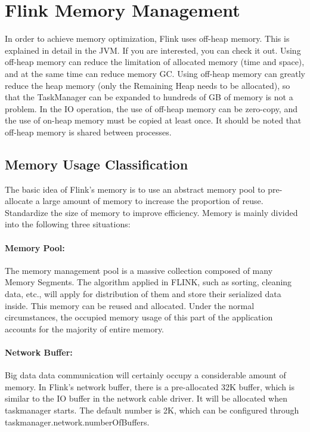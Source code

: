 \section*{Flink Memory Management}
In order to achieve memory optimization, Flink uses off-heap memory.
This is explained in detail in the JVM. If you are interested, you can
check it out. Using off-heap memory can reduce the limitation of
allocated memory (time and space), and at the same time can reduce
memory GC. Using off-heap memory can greatly reduce the heap memory
(only the Remaining Heap needs to be allocated), so that the
TaskManager can be expanded to hundreds of GB of memory is not a
problem. In the IO operation, the use of off-heap memory can be
zero-copy, and the use of on-heap memory must be copied at least once.
It should be noted that off-heap memory is shared between processes.

\subsection*{Memory Usage Classification}
The basic idea of Flink's memory is to use an abstract memory pool to
pre-allocate a large amount of memory to increase the proportion of
reuse. Standardize the size of memory to improve efficiency. Memory is
mainly divided into the following three situations:

\paragraph{Memory Pool:} 
The memory management pool is a massive collection composed of many
Memory Segments. The algorithm applied in FLINK, such as sorting,
cleaning data, etc., will apply for distribution of them and store
their serialized data inside. This memory can be reused and allocated.
Under the normal circumstances, the occupied memory usage of this part
of the application accounts for the majority of entire memory.

\paragraph{Network Buffer:} 
Big data data communication will certainly occupy a considerable
amount of memory. In Flink's network buffer, there is a pre-allocated
32K buffer, which is similar to the IO buffer in the network cable
driver. It will be allocated when taskmanager starts. The default
number is 2K, which can be configured through
taskmanager.network.numberOfBuffers.

